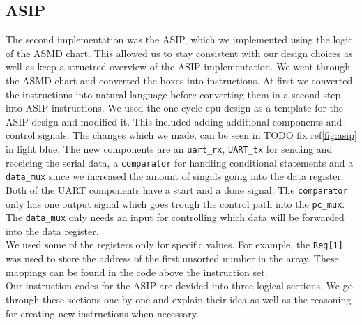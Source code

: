 \documentclass[conference]{IEEEtran}
\begin{document}
\subsection{ASIP}
The second implementation was the ASIP, which we implemented using the logic of the ASMD chart. This allowed us to stay consistent with our design choices as well as keep a structred overview of the ASIP implementation. We went through the ASMD chart and converted the boxes into instructions. At first we converted the instructions into natural language before converting them in a second step into ASIP instructions. We used the one-cycle cpu design as a template for the ASIP design and modified it. This included adding additional components and control signals. The changes which we made, can be seen in TODO fix ref\ref{fig:asip} in light blue. The new components are an \texttt{uart\_rx}, \texttt{UART\_tx} for sending and receicing the serial data, a \texttt{comparator} for handling conditional statements and a \texttt{data\_mux} since we increased the amount of singals going into the data register. Both of the UART components have a start and a done signal. The \texttt{comparator} only has one output signal which goes trough the control path into the \texttt{pc\_mux}. The \texttt{data\_mux} only needs an input for controlling which data will be forwarded into the data register.\\
We used some of the registers only for specific values. For example, the \texttt{Reg[1]} was used to store the address of the first unsorted number in the array. These mappings can be found in the code above the instruction set.\\
Our instruction codes for the ASIP are devided into three logical sections. We go through these sections one by one and explain their idea as well as the reasoning for creating new instructions when necessary.\\
\end{document}
